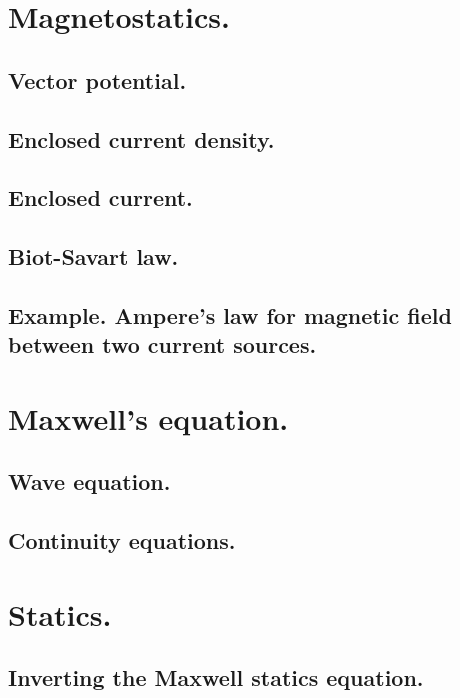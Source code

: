       \section{Magnetostatics.}
         
         \subsection{Vector potential.}
            
         \subsection{Enclosed current density.}
            
         \subsection{Enclosed current.}
            
         \subsection{Biot-Savart law.}
            
         \subsection{Example.  Ampere's law for magnetic field between two current sources.}
            
      \section{Maxwell's equation.}
         
      \subsection{Wave equation.}
         
      \subsection{Continuity equations.}
         
      \section{Statics.}
         \subsection{Inverting the Maxwell statics equation.}
            

